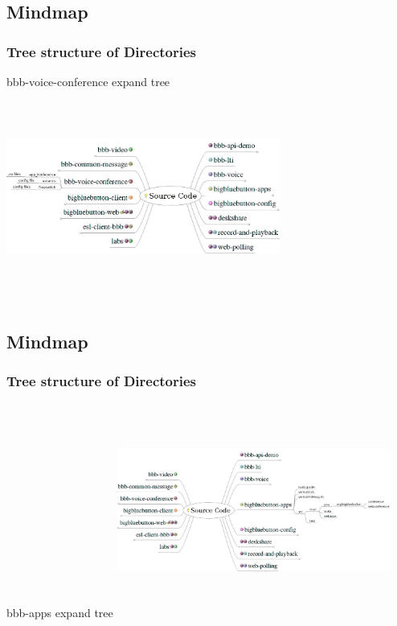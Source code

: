\documentclass{beamer}
\begin{document}
\subsection*{Mindmap}
\begin{frame}
\frametitle{Tree structure of Directories}
{bbb-voice-conference expand tree}
\includegraphics[height=70mm,width=90mm]{./images/SourceCode6.jpeg}
\end{frame}

\subsection*{Mindmap}
\begin{frame}
\frametitle{Tree structure of Directories}
{bbb-apps expand tree}
\includegraphics[height=70mm,width=90mm]{./images/SourceCode7.jpeg}
\end{frame}
\end{document}
